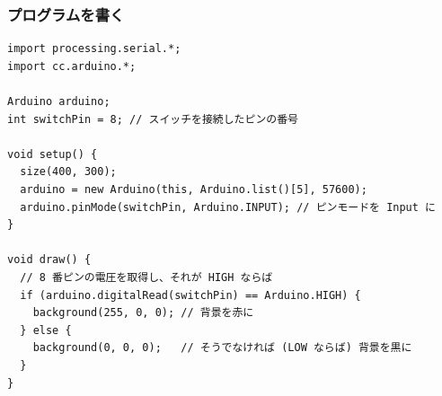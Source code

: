 \documentclass[11pt,a4paper]{jarticle}
\begin{document}
\subsubsection*{プログラムを書く}
\begin{lstlisting}
import processing.serial.*;
import cc.arduino.*;

Arduino arduino;
int switchPin = 8; // スイッチを接続したピンの番号
 
void setup() {
  size(400, 300);
  arduino = new Arduino(this, Arduino.list()[5], 57600);
  arduino.pinMode(switchPin, Arduino.INPUT); // ピンモードを Input に
}
 
void draw() {
  // 8 番ピンの電圧を取得し、それが HIGH ならば
  if (arduino.digitalRead(switchPin) == Arduino.HIGH) {
    background(255, 0, 0); // 背景を赤に
  } else {
    background(0, 0, 0);   // そうでなければ (LOW ならば) 背景を黒に
  }
}
\end{lstlisting}







 
 
\end{document}
